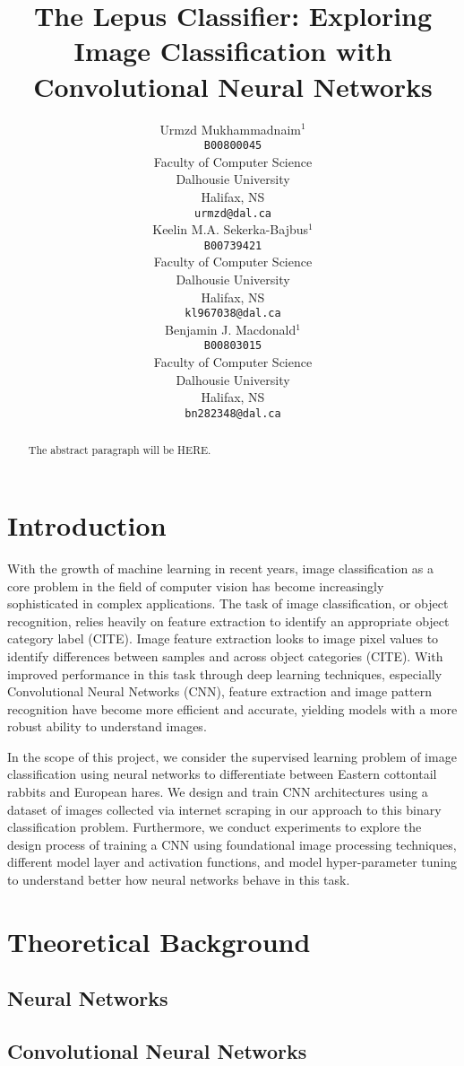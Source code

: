\documentclass{article}
\title{The Lepus Classifier: Exploring Image Classification with Convolutional Neural Networks}
\author{%
  Urmzd
  Mukhammadnaim$^1$\\
  \texttt{B00800045}\\
  Faculty of Computer Science\\
  Dalhousie University\\
  Halifax, NS  \\
  \texttt{urmzd@dal.ca} \\
  \And
  Keelin M.A.
  Sekerka-Bajbus$^1$\\
  \texttt{B00739421}\\
  Faculty of Computer Science\\
  Dalhousie University\\
  Halifax, NS  \\
  \texttt{kl967038@dal.ca} \\
  \AND
  Benjamin J. Macdonald$^1$ \\
  \texttt{B00803015}\\
  Faculty of Computer Science\\
  Dalhousie University\\
  Halifax, NS  \\
  \texttt{bn282348@dal.ca} \\
}
\begin{document}
\maketitle

\begin{abstract}
  The abstract paragraph will be HERE.
\end{abstract}

\section{Introduction}
With the growth of machine learning in recent years, image classification as a core problem in the field of computer vision has become increasingly sophisticated in complex applications. The task of image classification, or object recognition, relies heavily on feature extraction to identify an appropriate object category label (CITE). Image feature extraction looks to image pixel values to identify differences between samples and across object categories (CITE). With improved performance in this task through deep learning techniques, especially Convolutional Neural Networks (CNN), feature extraction and image pattern recognition have become more efficient and accurate, yielding models with a more robust ability to understand images.

In the scope of this project, we consider the supervised learning problem of image classification using neural networks to differentiate between Eastern cottontail rabbits and European hares. We design and train CNN architectures using a dataset of images collected via internet scraping in our approach to this binary classification problem. Furthermore, we conduct experiments to explore the design process of training a CNN using foundational image processing techniques, different model layer and activation functions, and model hyper-parameter tuning to understand better how neural networks behave in this task.

\section{Theoretical Background}
\subsection{Neural Networks}

\subsection{Convolutional Neural Networks}
\end{document}
